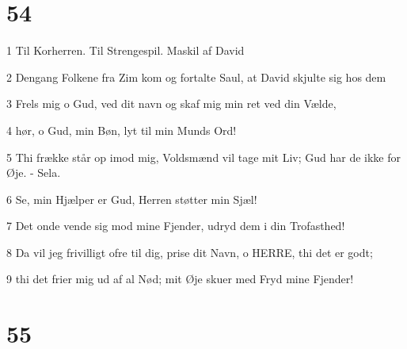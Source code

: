 \chapter{54}

\par 1 Til Korherren. Til Strengespil. Maskil af David
\par 2 Dengang Folkene fra Zim kom og fortalte Saul, at David skjulte sig hos dem
\par 3 Frels mig o Gud, ved dit navn og skaf mig min ret ved din Vælde,
\par 4 hør, o Gud, min Bøn, lyt til min Munds Ord!
\par 5 Thi frække står op imod mig, Voldsmænd vil tage mit Liv; Gud har de ikke for Øje. - Sela.
\par 6 Se, min Hjælper er Gud, Herren støtter min Sjæl!
\par 7 Det onde vende sig mod mine Fjender, udryd dem i din Trofasthed!
\par 8 Da vil jeg frivilligt ofre til dig, prise dit Navn, o HERRE, thi det er godt;
\par 9 thi det frier mig ud af al Nød; mit Øje skuer med Fryd mine Fjender!

\chapter{55}

